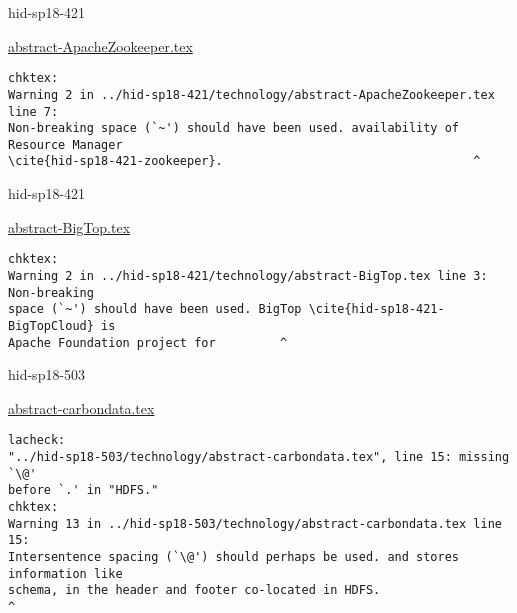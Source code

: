 \begin{IU}

hid-sp18-421

\href{https://github.com/cloudmesh-community/hid-sp18-421/blob/master//technology/abstract-ApacheZookeeper.tex}{abstract-ApacheZookeeper.tex}

\begin{tiny}
\begin{verbatim}
chktex:
Warning 2 in ../hid-sp18-421/technology/abstract-ApacheZookeeper.tex line 7:
Non-breaking space (`~') should have been used. availability of Resource Manager
\cite{hid-sp18-421-zookeeper}.                                   ^
\end{verbatim}
\end{tiny}
\end{IU}



\begin{IU}

hid-sp18-421

\href{https://github.com/cloudmesh-community/hid-sp18-421/blob/master//technology/abstract-BigTop.tex}{abstract-BigTop.tex}

\begin{tiny}
\begin{verbatim}
chktex:
Warning 2 in ../hid-sp18-421/technology/abstract-BigTop.tex line 3: Non-breaking
space (`~') should have been used. BigTop \cite{hid-sp18-421-BigTopCloud} is
Apache Foundation project for         ^
\end{verbatim}
\end{tiny}
\end{IU}



\begin{IU}

hid-sp18-503

\href{https://github.com/cloudmesh-community/hid-sp18-503/blob/master//technology/abstract-carbondata.tex}{abstract-carbondata.tex}

\begin{tiny}
\begin{verbatim}
lacheck:
"../hid-sp18-503/technology/abstract-carbondata.tex", line 15: missing `\@'
before `.' in "HDFS."
chktex:
Warning 13 in ../hid-sp18-503/technology/abstract-carbondata.tex line 15:
Intersentence spacing (`\@') should perhaps be used. and stores information like
schema, in the header and footer co-located in HDFS.
^
\end{verbatim}
\end{tiny}
\end{IU}

